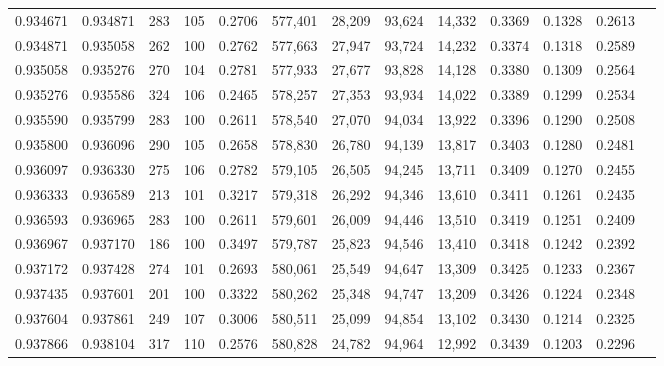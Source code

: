\begin{tabular}{rrrrrrrrrrrrr}
0.934671 & 0.934871 &   283 & 105 &                                     0.2706 & 577,401 &  28,209 &  93,624 &  14,332 & 0.3369 & 0.1328 & 0.2613 \\
0.934871 & 0.935058 &   262 & 100 &                                     0.2762 & 577,663 &  27,947 &  93,724 &  14,232 & 0.3374 & 0.1318 & 0.2589 \\
0.935058 & 0.935276 &   270 & 104 &                                     0.2781 & 577,933 &  27,677 &  93,828 &  14,128 & 0.3380 & 0.1309 & 0.2564 \\
0.935276 & 0.935586 &   324 & 106 &                                     0.2465 & 578,257 &  27,353 &  93,934 &  14,022 & 0.3389 & 0.1299 & 0.2534 \\
0.935590 & 0.935799 &   283 & 100 &                                     0.2611 & 578,540 &  27,070 &  94,034 &  13,922 & 0.3396 & 0.1290 & 0.2508 \\
0.935800 & 0.936096 &   290 & 105 &                                     0.2658 & 578,830 &  26,780 &  94,139 &  13,817 & 0.3403 & 0.1280 & 0.2481 \\
0.936097 & 0.936330 &   275 & 106 &                                     0.2782 & 579,105 &  26,505 &  94,245 &  13,711 & 0.3409 & 0.1270 & 0.2455 \\
0.936333 & 0.936589 &   213 & 101 &                                     0.3217 & 579,318 &  26,292 &  94,346 &  13,610 & 0.3411 & 0.1261 & 0.2435 \\
0.936593 & 0.936965 &   283 & 100 &                                     0.2611 & 579,601 &  26,009 &  94,446 &  13,510 & 0.3419 & 0.1251 & 0.2409 \\
0.936967 & 0.937170 &   186 & 100 &                                     0.3497 & 579,787 &  25,823 &  94,546 &  13,410 & 0.3418 & 0.1242 & 0.2392 \\
0.937172 & 0.937428 &   274 & 101 &                                     0.2693 & 580,061 &  25,549 &  94,647 &  13,309 & 0.3425 & 0.1233 & 0.2367 \\
0.937435 & 0.937601 &   201 & 100 &                                     0.3322 & 580,262 &  25,348 &  94,747 &  13,209 & 0.3426 & 0.1224 & 0.2348 \\
0.937604 & 0.937861 &   249 & 107 &                                     0.3006 & 580,511 &  25,099 &  94,854 &  13,102 & 0.3430 & 0.1214 & 0.2325 \\
0.937866 & 0.938104 &   317 & 110 &                                     0.2576 & 580,828 &  24,782 &  94,964 &  12,992 & 0.3439 & 0.1203 & 0.2296 \\

\end{tabular}
